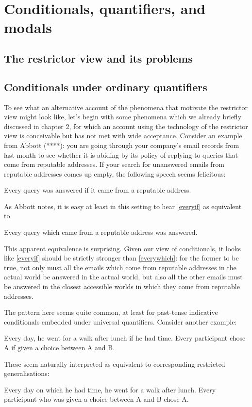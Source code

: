\documentclass[If.tex]{subfiles}
\begin{document}
\chapter{Conditionals, quantifiers, and modals} \label{chap:embedding}

\section{The restrictor view and its problems}

\section{Conditionals under ordinary quantifiers}
To see what an alternative account of the phenomena that motivate the restrictor view might look like, let's begin with some phenomena which we already briefly discussed in chapter 2, for which an account using the technology of the restrictor view is conceivable but has not met with wide acceptance.  Consider an example from Abbott (****): you are going through your company's email records from last month to see whether it is abiding by its policy of replying to queries that come from reputable addresses.  If your search for unanswered emails from reputable addresses comes up empty, the following speech seems felicitous:
\begin{prop}
	\nitem \label{everyif}
	Every query was answered if it came from a reputable address.
\end{prop}
As Abbott notes, it is easy at least in this setting to hear \ref{everyif} as equivalent to
\begin{prop}
	\nitem \label{everywhich}
	Every query which came from a reputable address was answered.
\end{prop}
This apparent equivalence is surprising.  Given our view of conditionals, it looks like \ref{everyif} should be strictly stronger than \ref{everywhich}: for the former to be true, not only must all the emails which come from reputable addresses in the actual world be answered in the actual world, but also all the other emails must be answered in the closest accessible worlds in which they come from reputable addresses.  

The pattern here seems quite common, at least for past-tense indicative conditionals embedded under universal quantifiers.  Consider another example:
\begin{prop}
	\nitem
	Every day, he went for a walk after lunch if he had time.
	\nitem
	Every participant chose A if given a choice between A and B.  
\end{prop}
These seem naturally interpreted as equivalent to corresponding restricted generalisations:
\begin{prop}
	\nitem
	Every day on which he had time, he went for a walk after lunch.  
	\nitem
	Every participant who was given a choice between A and B chose A.  
\end{prop}
\end{document}

